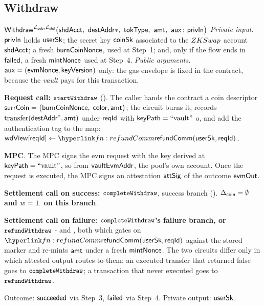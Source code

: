 \subsection{Withdraw}
\label{ssec:wdinst2}

\begin{ProcBox}{$\Withdraw^{\Lpub, \Lshd}\bigl(\shdAcct\bc \destAddr*\bc \tokType\bc \amt\bc
      \auxx \,;\, \privIn\bigr)$}\label{box:withdraw}
\sloppy
\emph{Private input.} $\mathsf{privIn}$ holds $\mathsf{userSk}$; the secret key $\mathsf{coinSk}$ associated to the $ZKSwap$ account $\mathsf{shdAcct}$; a
fresh $\mathsf{burnCoinNonce}$, used at Step~1; and, only if the flow ends in $\mathsf{failed}$, a fresh $\mathsf{mintNonce}$
used at Step~4.
\emph{Public arguments.} $\mathsf{aux} = (\mathsf{evmNonce}, \mathsf{keyVersion})$ only: the gas envelope is fixed in the
contract, because the \emph{vault} pays for this transaction.

 \begin{Steps}
 \item \textbf{Request call: $\texttt{\small startWithdraw}$} ().
 The caller hands the contract  a coin descriptor   $\mathsf{surrCoin} = \bigl(\mathsf{burnCoinNonce},\;\mathsf{color}, \mathsf{amt}\bigr)$; the circuit burns it, records  $\text{transfer}(\mathsf{destAddr}^*, \mathsf{amt})$ under $\mathsf{reqId}$ with $\mathsf{keyPath} = \text{``vault''}$ o, and add the authentication tag to the map:  $\wdView[\rid] \gets \lnk{fn:refundComm}{\refundComm(\usersk, \rid)}$.
   \smallskip

 \item \textbf{MPC}. The MPC signs the evm request with the key derived
       at $\mathsf{keyPath} = \text{``vault''}$, so from $\mathsf{vaultEvmAddr}$, the pool's own account. Once the request is executed,  the MPC signs an attestation $\mathsf{attSig}$ of the outcome $\mathsf{evmOut}$.
\item \textbf{Settlement call on success: $\texttt{\small completeWithdraw}$}, success branch  (). \textbf{$\Delta_{\mathsf{coin}} = \emptyset$ and $w = \bot$ on this branch}.
\item \textbf{Settlement call on failure: $\texttt{\small completeWithdraw}$'s failure branch, or $\texttt{\small refundWithdraw}$}
      -   and , both which gates on
      $\lnk{fn:refundComm}{\refundComm(\usersk, \rid)}$ against the stored marker  and re-mints $\mathsf{amt}$ under a fresh
      $\mathsf{mintNonce}$. The two circuits differ only in which attested output routes to them: an
      executed transfer that returned false goes to $\texttt{\small completeWithdraw}$; a transaction that never
       executed goes to $\texttt{\small refundWithdraw}$.
 \end{Steps}

\medskip
Outcome: $\mathsf{succeeded}$ via Step~3, $\mathsf{failed}$ via Step~4. Private output: $\mathsf{userSk}$.
\end{ProcBox}


